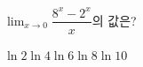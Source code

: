 $\displaystyle\lim_{x\to 0}\dfrac{8^x-2^x}{x}$의 값은?
\begin{choices32}{$\ln 2$}{$\ln 4$}{$\ln 6$}{$\ln 8$}{$\ln 10$}\end{choices32}

